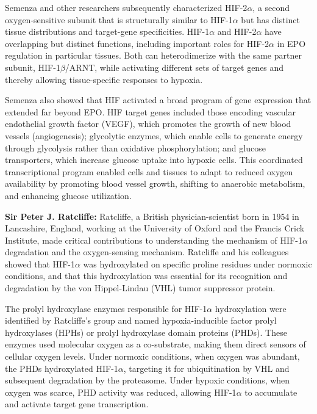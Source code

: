 Semenza and other researchers subsequently characterized HIF-2$\alpha$, a second oxygen-sensitive subunit that is structurally similar to HIF-1$\alpha$ but has distinct tissue distributions and target-gene specificities. HIF-1$\alpha$ and HIF-2$\alpha$ have overlapping but distinct functions, including important roles for HIF-2$\alpha$ in EPO regulation in particular tissues. Both can heterodimerize with the same partner subunit, HIF-1$\beta$/ARNT, while activating different sets of target genes and thereby allowing tissue-specific responses to hypoxia.

Semenza also showed that HIF activated a broad program of gene expression that extended far beyond EPO. HIF target genes included those encoding vascular endothelial growth factor (VEGF), which promotes the growth of new blood vessels (angiogenesis); glycolytic enzymes, which enable cells to generate energy through glycolysis rather than oxidative phosphorylation; and glucose transporters, which increase glucose uptake into hypoxic cells. This coordinated transcriptional program enabled cells and tissues to adapt to reduced oxygen availability by promoting blood vessel growth, shifting to anaerobic metabolism, and enhancing glucose utilization.

\textbf{Sir Peter J. Ratcliffe:} Ratcliffe, a British physician-scientist born in 1954 in Lancashire, England, working at the University of Oxford and the Francis Crick Institute, made critical contributions to understanding the mechanism of HIF-1$\alpha$ degradation and the oxygen-sensing mechanism. Ratcliffe and his colleagues showed that HIF-1$\alpha$ was hydroxylated on specific proline residues under normoxic conditions, and that this hydroxylation was essential for its recognition and degradation by the von Hippel-Lindau (VHL) tumor suppressor protein.

The prolyl hydroxylase enzymes responsible for HIF-1$\alpha$ hydroxylation were identified by Ratcliffe's group and named hypoxia-inducible factor prolyl hydroxylases (HPHs) or prolyl hydroxylase domain proteins (PHDs). These enzymes used molecular oxygen as a co-substrate, making them direct sensors of cellular oxygen levels. Under normoxic conditions, when oxygen was abundant, the PHDs hydroxylated HIF-1$\alpha$, targeting it for ubiquitination by VHL and subsequent degradation by the proteasome. Under hypoxic conditions, when oxygen was scarce, PHD activity was reduced, allowing HIF-1$\alpha$ to accumulate and activate target gene transcription.


